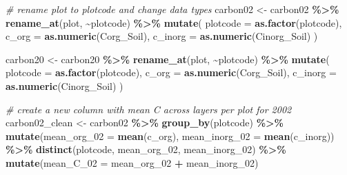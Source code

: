 \documentclass[
]{article}
\newenvironment{Shaded}{\begin{snugshade}}{\end{snugshade}}
\newcommand{\AttributeTok}[1]{\textcolor[rgb]{0.13,0.29,0.53}{#1}}
\newcommand{\CommentTok}[1]{\textcolor[rgb]{0.56,0.35,0.01}{\textit{#1}}}
\newcommand{\FunctionTok}[1]{\textcolor[rgb]{0.13,0.29,0.53}{\textbf{#1}}}
\newcommand{\NormalTok}[1]{#1}
\newcommand{\OtherTok}[1]{\textcolor[rgb]{0.56,0.35,0.01}{#1}}
\newcommand{\SpecialCharTok}[1]{\textcolor[rgb]{0.81,0.36,0.00}{\textbf{#1}}}
\newcommand{\StringTok}[1]{\textcolor[rgb]{0.31,0.60,0.02}{#1}}
\begin{document}
\begin{Shaded}
\begin{Highlighting}[]
\CommentTok{\# rename plot to plotcode and change data types }
\NormalTok{carbon02 }\OtherTok{\textless{}{-}}\NormalTok{ carbon02 }\SpecialCharTok{\%\textgreater{}\%}
  \FunctionTok{rename\_at}\NormalTok{(}\StringTok{\textquotesingle{}plot\textquotesingle{}}\NormalTok{, }\SpecialCharTok{\textasciitilde{}}\StringTok{\textquotesingle{}plotcode\textquotesingle{}}\NormalTok{) }\SpecialCharTok{\%\textgreater{}\%} 
  \FunctionTok{mutate}\NormalTok{(}
    \AttributeTok{plotcode =} \FunctionTok{as.factor}\NormalTok{(plotcode),}
    \AttributeTok{c\_org =} \FunctionTok{as.numeric}\NormalTok{(Corg\_Soil),}
    \AttributeTok{c\_inorg =} \FunctionTok{as.numeric}\NormalTok{(Cinorg\_Soil)}
\NormalTok{  )}
  
\NormalTok{carbon20 }\OtherTok{\textless{}{-}}\NormalTok{ carbon20 }\SpecialCharTok{\%\textgreater{}\%}
  \FunctionTok{rename\_at}\NormalTok{(}\StringTok{\textquotesingle{}plot\textquotesingle{}}\NormalTok{, }\SpecialCharTok{\textasciitilde{}}\StringTok{\textquotesingle{}plotcode\textquotesingle{}}\NormalTok{) }\SpecialCharTok{\%\textgreater{}\%}
  \FunctionTok{mutate}\NormalTok{(}
    \AttributeTok{plotcode =} \FunctionTok{as.factor}\NormalTok{(plotcode),}
    \AttributeTok{c\_org =} \FunctionTok{as.numeric}\NormalTok{(Corg\_Soil),}
    \AttributeTok{c\_inorg =} \FunctionTok{as.numeric}\NormalTok{(Cinorg\_Soil)}
\NormalTok{  )}


\CommentTok{\# create a new column with mean C across layers per plot for 2002}
\NormalTok{carbon02\_clean }\OtherTok{\textless{}{-}}\NormalTok{ carbon02 }\SpecialCharTok{\%\textgreater{}\%} \FunctionTok{group\_by}\NormalTok{(plotcode) }\SpecialCharTok{\%\textgreater{}\%} 
                    \FunctionTok{mutate}\NormalTok{(}\AttributeTok{mean\_org\_02 =} \FunctionTok{mean}\NormalTok{(c\_org), }\AttributeTok{mean\_inorg\_02 =} \FunctionTok{mean}\NormalTok{(c\_inorg)) }\SpecialCharTok{\%\textgreater{}\%}
                      \FunctionTok{distinct}\NormalTok{(plotcode, mean\_org\_02, mean\_inorg\_02) }\SpecialCharTok{\%\textgreater{}\%} 
                      \FunctionTok{mutate}\NormalTok{(}\AttributeTok{mean\_C\_02 =}\NormalTok{ mean\_org\_02 }\SpecialCharTok{+}\NormalTok{ mean\_inorg\_02)}


\end{Highlighting}
\end{Shaded}
\end{document}
